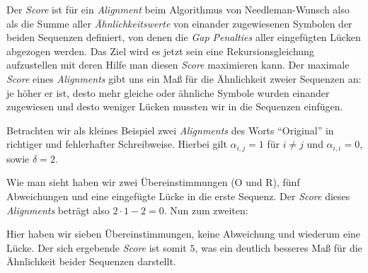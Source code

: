 Der \emph{Score} ist für ein \emph{Alignment} beim Algorithmus von Needleman-Wunsch also als die Summe aller \emph{Ähnlichkeitswerte} von einander zugewiesenen Symbolen der beiden Sequenzen definiert, von denen die \emph{Gap Penalties} aller eingefügten Lücken abgezogen werden. Das Ziel wird es jetzt sein eine Rekursionsgleichung aufzustellen mit deren Hilfe man diesen \emph{Score} maximieren kann. Der maximale \emph{Score} eines \emph{Alignments} gibt uns ein Maß für die Ähnlichkeit zweier Sequenzen an: je höher er ist, desto mehr gleiche oder ähnliche Symbole wurden einander zugewiesen und desto weniger Lücken mussten wir in die Sequenzen einfügen.

\begin{beispiel}
	Betrachten wir als kleines Beispiel zwei \emph{Alignments} des Worts \enquote{Original} in richtiger und fehlerhafter Schreibweise. Hierbei gilt $\alpha_{i,j} = 1$ für $i \neq j$ und $\alpha_{i,i} = 0$, sowie $\delta = 2$.
	
	\footnotesize
	\begin{center}
	\end{center}
	\normalsize
	
	Wie man sieht haben wir zwei Übereinstimmungen (O und R), fünf Abweichungen und eine eingefügte Lücke in die erste Sequenz. Der \emph{Score} dieses \emph{Alignments} beträgt also $2\cdot 1 - 2 = 0$. Nun zum zweiten:
	
	\footnotesize
	\begin{center}
	\end{center}
	\normalsize
	
	Hier haben wir sieben Übereinstimmungen, keine Abweichung und wiederum eine Lücke. Der sich ergebende \emph{Score} ist somit $5$, was ein deutlich besseres Maß für die Ähnlichkeit beider Sequenzen darstellt.
\end{beispiel}

